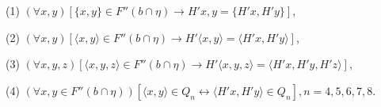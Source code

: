 (1) $(\forall x, y)[\{x, y\} \in F''(b \cap \eta) \rightarrow H'{x, y} = \{H'x, H'y\}]$,

(2) $(\forall x, y)[\langle x, y \rangle \in F''(b \cap \eta) \rightarrow H'{\langle x, y \rangle} = \langle H'x, H'y \rangle]$,

(3) $(\forall x, y, z)[\langle x, y, z \rangle \in F''(b \cap \eta) \rightarrow H'{\langle x, y, z \rangle} = \langle H'x, H'y, H'z \rangle]$,

(4) $(\forall x, y \in F''(b \cap \eta))[\langle x, y \rangle \in Q_n \leftrightarrow \langle H'x, H'y \rangle \in Q_n], n = 4, 5, 6, 7, 8.$

